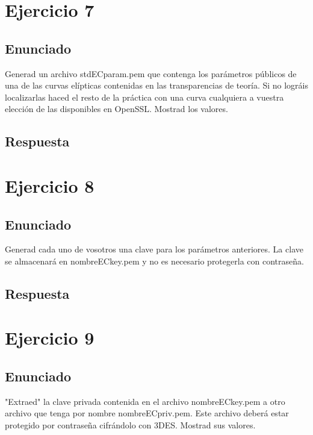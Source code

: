 \documentclass[10pt,a4paper,spanish]{report}
\begin{document}
\chapter{Ejercicio 7}

\section{Enunciado}
\noindent
Generad un archivo stdECparam.pem que contenga los parámetros públicos de una de las curvas elípticas contenidas en las transparencias de teoría. Si no lográis localizarlas haced el resto de la práctica con una curva cualquiera a vuestra elección de las disponibles en OpenSSL. Mostrad los valores.

\section{Respuesta}
\noindent

\chapter{Ejercicio 8}

\section{Enunciado}
\noindent
Generad cada uno de vosotros una clave para los parámetros anteriores. La clave se almacenará en nombreECkey.pem y no es necesario protegerla con contraseña.

\section{Respuesta}
\noindent

\chapter{Ejercicio 9}

\section{Enunciado}
\noindent
"Extraed" la clave privada contenida en el archivo nombreECkey.pem a otro archivo que tenga por nombre nombreECpriv.pem. Este archivo deberá estar protegido por contraseña cifrándolo con 3DES. Mostrad sus valores.
\end{document}

